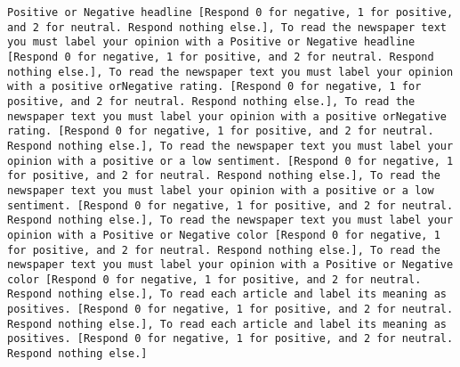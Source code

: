 \begin{lstlisting}[label=lst:poor_performing_prompts]
Positive or Negative headline [Respond 0 for negative, 1 for positive, and 2 for neutral. Respond nothing else.], To read the newspaper text you must label your opinion with a Positive or Negative headline [Respond 0 for negative, 1 for positive, and 2 for neutral. Respond nothing else.], To read the newspaper text you must label your opinion with a positive orNegative rating. [Respond 0 for negative, 1 for positive, and 2 for neutral. Respond nothing else.], To read the newspaper text you must label your opinion with a positive orNegative rating. [Respond 0 for negative, 1 for positive, and 2 for neutral. Respond nothing else.], To read the newspaper text you must label your opinion with a positive or a low sentiment. [Respond 0 for negative, 1 for positive, and 2 for neutral. Respond nothing else.], To read the newspaper text you must label your opinion with a positive or a low sentiment. [Respond 0 for negative, 1 for positive, and 2 for neutral. Respond nothing else.], To read the newspaper text you must label your opinion with a Positive or Negative color [Respond 0 for negative, 1 for positive, and 2 for neutral. Respond nothing else.], To read the newspaper text you must label your opinion with a Positive or Negative color [Respond 0 for negative, 1 for positive, and 2 for neutral. Respond nothing else.], To read each article and label its meaning as positives. [Respond 0 for negative, 1 for positive, and 2 for neutral. Respond nothing else.], To read each article and label its meaning as positives. [Respond 0 for negative, 1 for positive, and 2 for neutral. Respond nothing else.]


\end{lstlisting}
